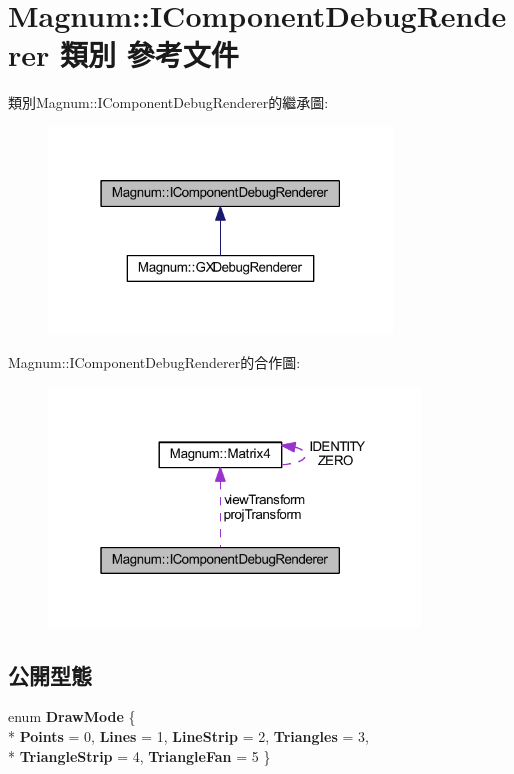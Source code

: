 \hypertarget{class_magnum_1_1_i_component_debug_renderer}{}\section{Magnum\+:\+:I\+Component\+Debug\+Renderer 類別 參考文件}
\label{class_magnum_1_1_i_component_debug_renderer}


類別\+Magnum\+:\+:I\+Component\+Debug\+Renderer的繼承圖\+:\nopagebreak
\begin{figure}[H]
\begin{center}
\leavevmode
\includegraphics[width=259pt]{class_magnum_1_1_i_component_debug_renderer__inherit__graph}
\end{center}
\end{figure}


Magnum\+:\+:I\+Component\+Debug\+Renderer的合作圖\+:\nopagebreak
\begin{figure}[H]
\begin{center}
\leavevmode
\includegraphics[width=280pt]{class_magnum_1_1_i_component_debug_renderer__coll__graph}
\end{center}
\end{figure}
\subsection*{公開型態}
\begin{DoxyCompactItemize}
\item 
enum {\bfseries Draw\+Mode} \{ \\*
{\bfseries Points} = 0, 
{\bfseries Lines} = 1, 
{\bfseries Line\+Strip} = 2, 
{\bfseries Triangles} = 3, 
\\*
{\bfseries Triangle\+Strip} = 4, 
{\bfseries Triangle\+Fan} = 5
 \}\hypertarget{class_magnum_1_1_i_component_debug_renderer_a4ff66311aaec0b675af0cb9fd6f8ac6d}{}\label{class_magnum_1_1_i_component_debug_renderer_a4ff66311aaec0b675af0cb9fd6f8ac6d}

\end{DoxyCompactItemize}

